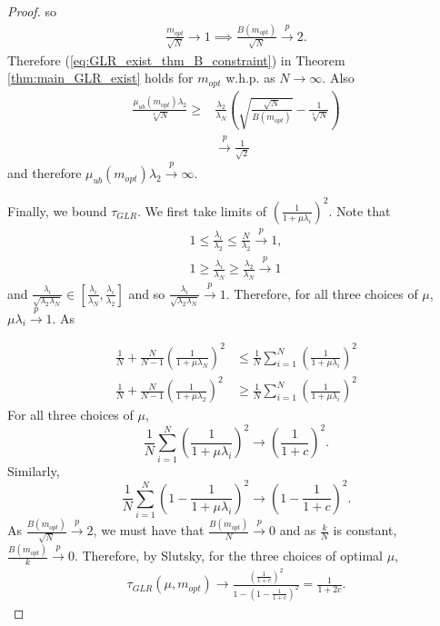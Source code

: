 \begin{proof}
so 
\begin{align}
 \frac{m_{opt}}{\sqrt{N}} \to 1 \implies \frac{B(m_{opt})}{\sqrt{N}} \overset{p}{\to} 2.  \label{eq:Proof_GLR_big_N:B_mopt}
\end{align}
Therefore (\ref{eq:GLR_exist_thm_B_constraint}) in Theorem \ref{thm:main_GLR_exist} holds for $m_{opt}$ w.h.p. as $N \to \infty$.
Also
\begin{align} \frac{\mu_{ub}\left(m_{opt}\right)\lambda_{2}}{\sqrt[4]{N}} \geq &\frac{\lambda_{2}}{\lambda_{N}} \left( \sqrt{\frac{\sqrt{N}}{B(m_{opt})}}-\frac{1}{\sqrt[4]{N}} \right) \\
&\overset{p}{\to} \frac{1}{\sqrt{2}}
\end{align}
and therefore ${\mu_{ub}\left(m_{opt}\right)\lambda_{2}} \overset{p}{\to} \infty$.

Finally, we bound $\tau_{GLR}$. We first take limits of $\left(\frac{1}{1 + \mu\lambda_{i}}\right)^{2}$. Note that
\begin{align}
    1 \leq \frac{\lambda_{i}}{\lambda_{2}} \leq \frac{N}{\lambda_{2}} \overset{p}{\to} 1, \\
    1 \geq \frac{\lambda_{i}}{\lambda_{N}} \geq \frac{\lambda_{2}}{\lambda_{N}} \overset{p}{\to} 1
\end{align}
and $\frac{\lambda_{i}}{\sqrt{\lambda_{2}\lambda_{N}}} \in \left[ \frac{\lambda_{i}}{\lambda_{N}}, \frac{\lambda_{i}}{\lambda_{2}} \right]$ and so $\frac{\lambda_{i}}{\sqrt{\lambda_{2}\lambda_{N}}} \overset{p}{\to} 1$. Therefore, for all three choices of $\mu$, $\mu\lambda_{i} \overset{p}{\to} 1$. As

\begin{align}
    \frac{1}{N} + \frac{N}{N-1}\left(\frac{1}{1 + \mu\lambda_{N}}\right)^{2} &\leq \frac{1}{N}\sum_{i = 1}^{N}\left(\frac{1}{1+  \mu \lambda_{i}} \right)^{2} \\
    \frac{1}{N} + \frac{N}{N-1}\left(\frac{1}{1 + \mu\lambda_{2}}\right)^{2} &\geq \frac{1}{N}\sum_{i = 1}^{N}\left(\frac{1}{1+  \mu \lambda_{i}} \right)^{2}
\end{align}
For all three choices of $\mu$, 
\begin{equation}
    \frac{1}{N}\sum_{i = 1}^{N}\left(\frac{1}{1+  \mu \lambda_{i}} \right)^{2} \to \left(\frac{1}{1 + c}\right)^{2}.
\end{equation}
Similarly,
\begin{equation}
    \frac{1}{N}\sum_{i = 1}^{N}\left(1 - \frac{1}{1+  \mu \lambda_{i}} \right)^{2} \to \left(1 - \frac{1}{1 + c}\right)^{2}.
\end{equation}
As $\frac{B(m_{opt})}{\sqrt{N}} \overset{p}{\to} 2$, we must have that $\frac{B(m_{opt})}{{N}} \overset{p}{\to} 0$ and as $\frac{k}{N}$ is constant, $\frac{B(m_{opt})}{k} \overset{p}{\to} 0$. Therefore, by Slutsky, for the three choices of optimal $\mu$,
\begin{align}
    \tau_{GLR}(\mu,m_{opt}) \to \frac{\left(\frac{1}{1 + c}\right)^{2}}{1 - \left(1 - \frac{1}{1 + c}\right)^{2}} = \frac{1}{1+2c}.
\end{align}
\end{proof}
\iffalse
